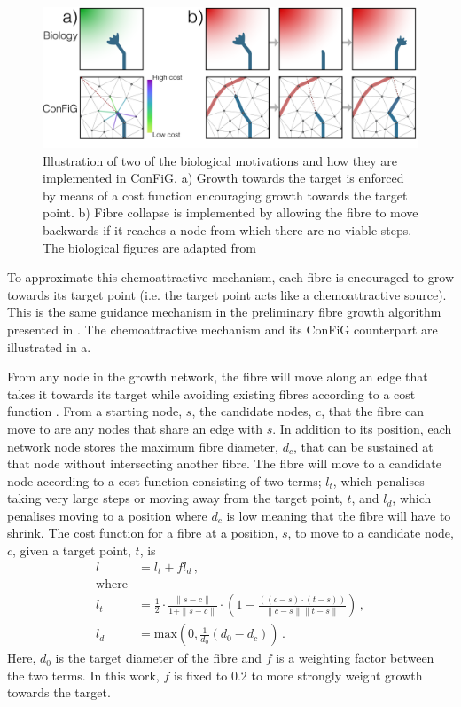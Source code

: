 \begin{figure}
  \centering
  \includegraphics[width=\textwidth]{figures/config/biological_target+cam-01.png}
  \caption[Illustration of the chemoattraction process]{Illustration of two of the biological motivations and how they are implemented in \ac{ConFiG}. a) Growth towards the target is enforced by means of a cost function encouraging growth towards the target point. b) Fibre collapse is implemented by allowing the fibre to move backwards if it reaches a node from which there are no viable steps. The biological figures are adapted from \cite{Price2017}}
  \label{fig:config_chemoattraction}
\end{figure}

To approximate this chemoattractive mechanism, each fibre is encouraged to grow towards its target point (i.e. the target point acts like a chemoattractive source). This is the same guidance mechanism in the preliminary fibre growth algorithm presented in .
The chemoattractive mechanism and its \ac{ConFiG} counterpart are illustrated in a.

From any node in the growth network, the fibre will move along an edge that takes it towards its target while avoiding existing fibres according to a cost function \cite{Callaghan2019}.
From a starting node, $s$, the candidate nodes, $c$, that the fibre can move to are any nodes that share an edge with $s$. In addition to its position, each network node stores the maximum fibre diameter, $d_c$, that can be sustained at that node without intersecting another fibre. The fibre will move to a candidate node according to a cost function consisting of two terms; $l_t$, which penalises taking very large steps or moving away from the target point, $t$, and $l_d$, which penalises moving to a position where $d_c$ is low meaning that the fibre will have to shrink. The cost function for a fibre at a position, $s$, to move to a candidate node, $c$, given a target point, $t$, is
\begin{align}
  l &= l_t+fl_d  \,,\label{eq:original_cost}\\
      \mathrm{where}\nonumber\\
  l_t &=  \frac{1}{2} \cdot \frac{\|s-c\|}{1+ \|s-c\|} \cdot \left(1- \frac{\left(\left(c-s\right) \cdot \left(t-s\right)\right)}{\|c-s\|\|t-s\|}\right)\,, \label{eq:original_lt}\\
  l_d &=\mathrm{max}\left(0, \frac{1}{d_0} \left(d_0 - d_c \right)\right) \,. \label{eq:original_ld}
\end{align}
Here, $d_0$ is the target diameter of the fibre and $f$ is a weighting factor between the two terms. In this work, $f$ is fixed to 0.2 to more strongly weight growth towards the target.

